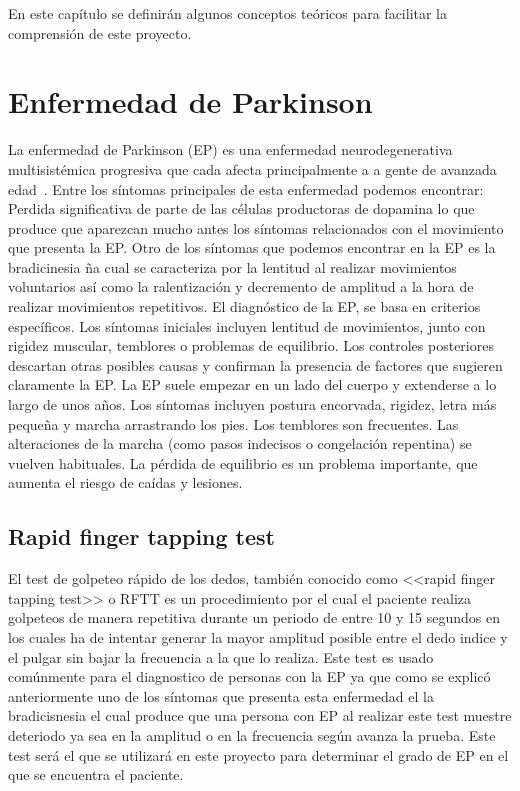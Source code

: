 
En este capítulo se definirán algunos conceptos teóricos para facilitar la comprensión de este proyecto.

\section{Enfermedad de Parkinson}

La enfermedad de Parkinson (EP) es una  enfermedad neurodegenerativa multisistémica progresiva que cada afecta principalmente a a gente de avanzada edad~\cite{pdsymptoms}. 
Entre los síntomas principales de esta enfermedad podemos encontrar:
Perdida significativa de parte de las células productoras de dopamina lo que produce que aparezcan mucho antes los síntomas relacionados con el movimiento que presenta la EP. Otro de los síntomas que podemos encontrar en la EP es la bradicinesia ña cual se caracteriza por la lentitud al realizar movimientos voluntarios así como la ralentización y decremento de amplitud a la hora de realizar movimientos repetitivos.
El diagnóstico de la EP, se basa en criterios específicos. Los síntomas iniciales incluyen lentitud de movimientos, junto con rigidez muscular, temblores o problemas de equilibrio. Los controles posteriores descartan otras posibles causas y confirman la presencia de factores que sugieren claramente la EP.
La EP suele empezar en un lado del cuerpo y extenderse a lo largo de unos años. Los síntomas incluyen postura encorvada, rigidez, letra más pequeña y marcha arrastrando los pies. Los temblores son frecuentes.
Las alteraciones de la marcha (como pasos indecisos o congelación repentina) se vuelven habituales. La pérdida de equilibrio es un problema importante, que aumenta el riesgo de caídas y lesiones.

\subsection{Rapid finger tapping test}

El test de golpeteo rápido de los dedos, también conocido como <<rapid finger tapping test>> o RFTT es un procedimiento por el cual el paciente realiza golpeteos de manera repetitiva durante un periodo de entre 10 y 15 segundos en los cuales ha de intentar generar la mayor amplitud posible entre el dedo indice y el pulgar sin bajar la frecuencia a la que lo realiza. Este test es usado comúnmente para el diagnostico de personas con la EP ya que como se explicó anteriormente uno de los síntomas que presenta esta enfermedad el la bradicisnesia el cual produce que una persona con EP al realizar este test muestre deteriodo ya sea en la amplitud o en la frecuencia según avanza la prueba. Este test será el que se utilizará en este proyecto para determinar el grado de EP en el que se encuentra el paciente.

